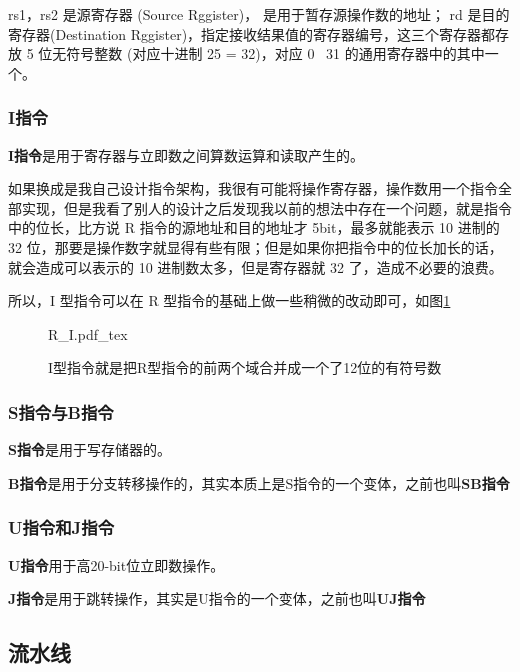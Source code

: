 rs1，rs2 是源寄存器 (Source Rggister)， 是用于暂存源操作数的地址；
rd 是目的寄存器(Destination Rggister)，指定接收结果值的寄存器编号，这三个寄存器都存放 5 位无符号整数 (对应十进制 25 = 32)，对应 0 ~31 的通用寄存器中的其中一个。

\subsubsection{I指令}
\textbf{I指令}是用于寄存器与立即数之间算数运算和读取产生的。

如果换成是我自己设计指令架构，我很有可能将操作寄存器，操作数用一个指令全部实现，但是我看了别人的设计之后发现我以前的想法中存在一个问题，就是指令中的位长，比方说 R 指令的源地址和目的地址才 5bit，最多就能表示 10 进制的 32 位，那要是操作数字就显得有些有限；但是如果你把指令中的位长加长的话，就会造成可以表示的 10 进制数太多，但是寄存器就 32 了，造成不必要的浪费。

所以，I 型指令可以在 R 型指令的基础上做一些稍微的改动即可，如图\ref{fig:R_I}

\begin{figure}[htbp]
    \centering
    \def\svgwidth{\columnwidth}
    {R_I.pdf_tex}
    \caption{I型指令就是把R型指令的前两个域合并成一个了12位的有符号数}
    \label{fig:R_I}
\end{figure}




\subsubsection{S指令与B指令}
\textbf{S指令}是用于写存储器的。

\textbf{B指令}是用于分支转移操作的，其实本质上是S指令的一个变体，之前也叫\textbf{SB指令}

\subsubsection{U指令和J指令}
\textbf{U指令}用于高20-bit位立即数操作。

\textbf{J指令}是用于跳转操作，其实是U指令的一个变体，之前也叫\textbf{UJ指令}


\subsection{流水线}

